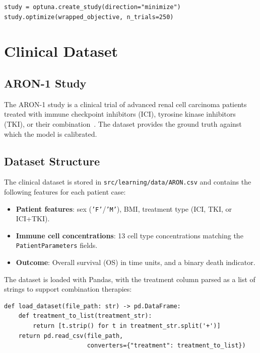 \begin{lstlisting}[caption={Optuna study creation and execution.}, label={lst:optuna-study}]
study = optuna.create_study(direction="minimize")
study.optimize(wrapped_objective, n_trials=250)
\end{lstlisting}



\section{Clinical Dataset}
\label{sec:clinical-dataset}

\subsection{ARON-1 Study}

The ARON-1 study is a clinical trial of advanced renal cell carcinoma patients treated with immune checkpoint inhibitors (ICI), tyrosine kinase inhibitors (TKI), or their combination~\cite{rini2019, motzer2019}. The dataset provides the ground truth against which the model is calibrated.

\subsection{Dataset Structure}

The clinical dataset is stored in \texttt{src/learning/data/ARON.csv} and contains the following features for each patient case:

\begin{itemize}
    \item \textbf{Patient features}: sex (\texttt{'F'}/\texttt{'M'}), BMI, treatment type (ICI, TKI, or ICI+TKI).
    \item \textbf{Immune cell concentrations}: 13 cell type concentrations matching the \texttt{PatientParameters} fields.
    \item \textbf{Outcome}: Overall survival (OS) in time units, and a binary death indicator.
\end{itemize}

The dataset is loaded with Pandas, with the treatment column parsed as a list of strings to support combination therapies:

\begin{lstlisting}[caption={Dataset loading.}]
def load_dataset(file_path: str) -> pd.DataFrame:
    def treatment_to_list(treatment_str):
        return [t.strip() for t in treatment_str.split('+')]
    return pd.read_csv(file_path,
                       converters={"treatment": treatment_to_list})
\end{lstlisting}

